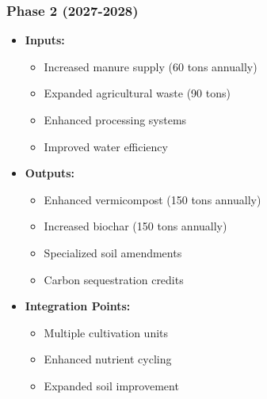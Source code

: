 \subsubsection{Phase 2 (2027-2028)}
\begin{itemize}
    \item \textbf{Inputs:}
    \begin{itemize}
        \item Increased manure supply (60 tons annually)
        \item Expanded agricultural waste (90 tons)
        \item Enhanced processing systems
        \item Improved water efficiency
    \end{itemize}
    \item \textbf{Outputs:}
    \begin{itemize}
        \item Enhanced vermicompost (150 tons annually)
        \item Increased biochar (150 tons annually)
        \item Specialized soil amendments
        \item Carbon sequestration credits
    \end{itemize}
    \item \textbf{Integration Points:}
    \begin{itemize}
        \item Multiple cultivation units
        \item Enhanced nutrient cycling
        \item Expanded soil improvement
    \end{itemize}
\end{itemize}

